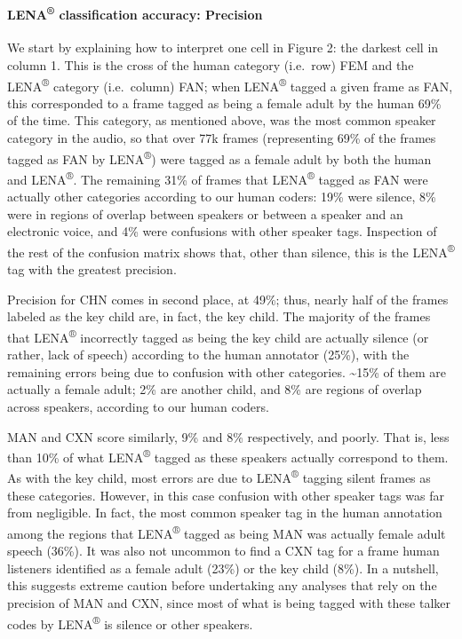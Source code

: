 \documentclass[english,floatsintext,man]{apa6}
\begin{document}
\paragraph{\texorpdfstring{LENA\textsuperscript{®} classification
accuracy:
Precision}{LENA® classification accuracy: Precision}}\label{lena-classification-accuracy-precision}

We start by explaining how to interpret one cell in Figure 2: the
darkest cell in column 1. This is the cross of the human category
(i.e.~row) FEM and the LENA\textsuperscript{®} category (i.e.~column)
FAN; when LENA\textsuperscript{®} tagged a given frame as FAN, this
corresponded to a frame tagged as being a female adult by the human 69\%
of the time. This category, as mentioned above, was the most common
speaker category in the audio, so that over 77k frames (representing
69\% of the frames tagged as FAN by LENA\textsuperscript{®}) were tagged
as a female adult by both the human and LENA\textsuperscript{®}. The
remaining 31\% of frames that LENA\textsuperscript{®} tagged as FAN were
actually other categories according to our human coders: 19\% were
silence, 8\% were in regions of overlap between speakers or between a
speaker and an electronic voice, and 4\% were confusions with other
speaker tags. Inspection of the rest of the confusion matrix shows that,
other than silence, this is the LENA\textsuperscript{®} tag with the
greatest precision.

Precision for CHN comes in second place, at 49\%; thus, nearly half of
the frames labeled as the key child are, in fact, the key child. The
majority of the frames that LENA\textsuperscript{®} incorrectly tagged
as being the key child are actually silence (or rather, lack of speech)
according to the human annotator (25\%), with the remaining errors being
due to confusion with other categories. \textasciitilde{}15\% of them
are actually a female adult; 2\% are another child, and 8\% are regions
of overlap across speakers, according to our human coders.

MAN and CXN score similarly, 9\% and 8\% respectively, and poorly. That
is, less than 10\% of what LENA\textsuperscript{®} tagged as these
speakers actually correspond to them. As with the key child, most errors
are due to LENA\textsuperscript{®} tagging silent frames as these
categories. However, in this case confusion with other speaker tags was
far from negligible. In fact, the most common speaker tag in the human
annotation among the regions that LENA\textsuperscript{®} tagged as
being MAN was actually female adult speech (36\%). It was also not
uncommon to find a CXN tag for a frame human listeners identified as a
female adult (23\%) or the key child (8\%). In a nutshell, this suggests
extreme caution before undertaking any analyses that rely on the
precision of MAN and CXN, since most of what is being tagged with these
talker codes by LENA\textsuperscript{®} is silence or other speakers.
\end{document}
